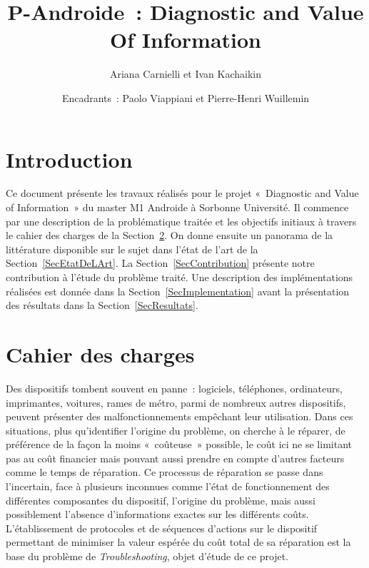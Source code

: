 \documentclass[a4paper,11pt]{article}
\theoremstyle{plain}
\begin{document}


\pagestyle{plain}

\title{P-Androide~: Diagnostic and Value Of Information}
\author{Ariana Carnielli et Ivan Kachaikin}
\date{Encadrants~: Paolo Viappiani et Pierre-Henri Wuillemin}
\maketitle

\tableofcontents


\section{Introduction}

Ce document présente les travaux réalisés pour le projet «~Diagnostic and Value of Information~» du master M1 Androide à Sorbonne Université. Il commence par une description de la problématique traitée et les objectifs initiaux à travers le cahier des charges de la Section~\ref{SecCharges}. On donne ensuite un panorama de la littérature disponible sur le sujet dans l'état de l'art de la Section~\ref{SecEtatDeLArt}. La Section~\ref{SecContribution} présente notre contribution à l'étude du problème traité. Une description des implémentations réalisées est donnée dans la Section~\ref{SecImplementation} avant la présentation des résultats dans la Section~\ref{SecResultats}.

\section{Cahier des charges}
\label{SecCharges}

Des dispositifs tombent souvent en panne~: logiciels, téléphones, ordinateurs, imprimantes, voitures, rames de métro, parmi de nombreux autres dispositifs, peuvent présenter des malfonctionnements empêchant leur utilisation. Dans ces situations, plus qu'identifier l'origine du problème, on cherche à le réparer, de préférence de la façon la moins «~coûteuse~» possible, le coût ici ne se limitant pas au coût financier mais pouvant aussi prendre en compte d'autres facteurs comme le temps de réparation. Ce processus de réparation se passe dans l'incertain, face à plusieurs inconnues comme l'état de fonctionnement des différentes composantes du dispositif, l'origine du problème, mais aussi possiblement l'absence d'informations exactes sur les différents coûts. L'établissement de protocoles et de séquences d'actions sur le dispositif permettant de minimiser la valeur espérée du coût total de sa réparation est la base du problème de \emph{Troubleshooting}, objet d'étude de ce projet.
\end{document}
